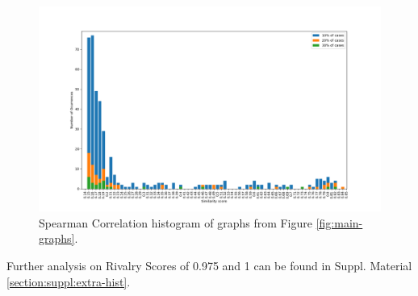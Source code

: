 \begin{figure}[!h]
    \centering
    \includegraphics[width=0.75\linewidth]{Minor Thesis/figures/graphs/hist/Hist95.png}
    \caption{Spearman Correlation histogram of graphs from Figure \ref{fig:main-graphs}.}
    \label{fig:main-hist}
\end{figure}

Further analysis on Rivalry Scores of 0.975 and 1 can be found in Suppl. Material \ref{section:suppl:extra-hist}.